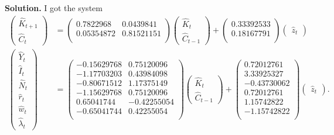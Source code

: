 \documentclass[11pt]{article}
\numberwithin{equation}{section} %
\numberwithin{figure}{section} %
\numberwithin{table}{section} %
\theoremstyle{definition}
\newenvironment{solution}{\begin{addmargin}[2em]{0em} {\bf Solution. }}{\end{addmargin}}
\begin{document}
\begin{solution}
    I got the system
    \begin{align*}
        \begin{pmatrix}
            \hat{K}_{t+1} \\
            \hat{C}_t
        \end{pmatrix} &= \begin{pmatrix}
            0.7822968 & 0.0439841\\
            0.05354872 & 0.81521151\\
          \end{pmatrix} \begin{pmatrix}
            \hat{K}_t \\
            \hat{C}_{t-1}
        \end{pmatrix} + \begin{pmatrix}
            0.33392533\\
            0.18167791\\
          \end{pmatrix} \begin{pmatrix}
            \hat{z}_t
        \end{pmatrix} \\
        \begin{pmatrix}
            \hat{Y}_t \\
            \hat{I}_t \\
            \hat{N}_t \\
            \hat{r}_t \\
            \hat{w}_t \\
            \hat{\lambda}_t
        \end{pmatrix} &= \begin{pmatrix}
            -0.15629768 & 0.75120096\\
            -1.17703203 & 0.43984098\\
            -0.80671512 & 1.17375149\\
            -1.15629768 & 0.75120096\\
            0.65041744 & -0.42255054\\
            -0.65041744 & 0.42255054\\
          \end{pmatrix} \begin{pmatrix}
            \hat{K}_t \\
            \hat{C}_{t-1}
        \end{pmatrix} + \begin{pmatrix}
            0.72012761\\
            3.33925327\\
            -0.43730062\\
            0.72012761\\
            1.15742822\\
            -1.15742822\\
          \end{pmatrix} \begin{pmatrix}
            \hat{z}_t
        \end{pmatrix}.
    \end{align*}


\end{solution}
\end{document}
